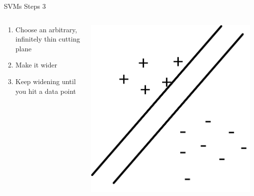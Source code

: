 \documentclass[aspectratio=169]{beamer}
\begin{document}
\begin{frame}{SVMs Steps 3}

\begin{columns}[T]
\begin{column}{0.6\textwidth}
\begin{enumerate}
\item  Choose an arbitrary, infinitely thin cutting plane
\item Make it wider
\item Keep widening until you hit a data point
\end{enumerate}
\end{column}
\begin{column}{0.4\textwidth}
\includegraphics[width=1\textwidth]{lectSVM/svm3}
\end{column}
\end{columns}
\end{frame}
\end{document}

